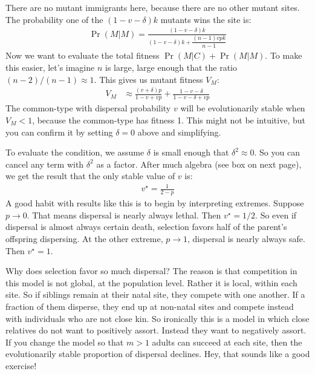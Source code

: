 \documentclass[10pt,reqno]{amsbook}
\numberwithin{equation}{chapter}
\begin{document}
There are no mutant immigrants here, because there are no other mutant sites. The probability one of the $(1-v-\delta)k$ mutants wins the site is:
\begin{align*}
	\Pr(M|M) = \frac{ (1-v-\delta)k }{ (1-v-\delta)k + \dfrac{(n-1)vpk}{n-1} }
\end{align*}
Now we want to evaluate the total fitness $\Pr(M|C) + \Pr(M|M)$. To make this easier, let's imagine $n$ is large, large enough that the ratio $(n-2)/(n-1) \approx 1$. This gives us mutant fitness $V_M$:
\begin{align*}
	V_M &\approx \frac{ (v+\delta)p }{1-v + vp } 
	+ \frac{ 1-v-\delta }{ 1-v-\delta + vp }
\end{align*}
The common-type with dispersal probability $v$ will be evolutionarily stable when $V_M<1$, because the common-type has fitness 1. This might not be intuitive, but you can confirm it by setting $\delta=0$ above and simplifying.

To evaluate the condition, we assume $\delta$ is small enough that $\delta^2 \approx 0$. So you can cancel any term with $\delta^2$ as a factor. After much algebra (see box on next page), we get the result that the only stable value of $v$ is:
\begin{align*}
	v^\star = \frac{1}{2-p}
\end{align*}
A good habit with results like this is to begin by interpreting extremes. Suppose $p \rightarrow 0$. That means dispersal is nearly always lethal. Then $v^\star = 1/2$. So even if dispersal is almost always certain death, selection favors half of the parent's offspring dispersing. At the other extreme, $p \rightarrow 1$, dispersal is nearly always safe. Then $v^\star=1$. 

Why does selection favor so much dispersal? The reason is that competition in this model is not global, at the population level. Rather it is local, within each site. So if siblings remain at their natal site, they compete with one another. If a fraction of them disperse, they end up at non-natal sites and compete instead with individuals who are not close kin. So ironically this is a model in which close relatives do not want to positively assort. Instead they want to negatively assort. If you change the model so that $m>1$ adults can succeed at each site, then the evolutionarily stable proportion of dispersal declines. Hey, that sounds like a good exercise!
\end{document}
